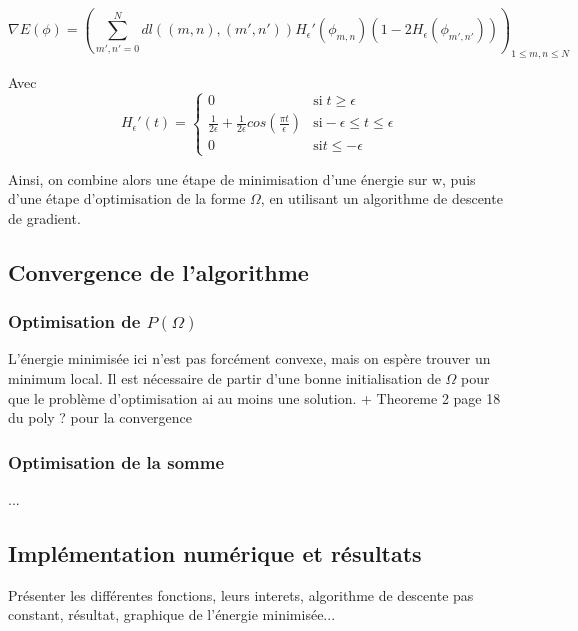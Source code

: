 \[ \nabla E (\phi) = ( \sum \limits_{m',n' = 0}^N dl((m,n),(m',n')) H_{\epsilon}' (\phi_{m,n}) ( 1 - 2H_{\epsilon}(\phi_{m',n'}))  ) _{1 \leq m,n \leq N} \] 

Avec 
\[ H_{\epsilon}' (t) = \left\{ \begin{matrix}
0 & \text{si} \; t \geq \epsilon \\
\frac{1}{2 \epsilon} + \frac{1}{2 \epsilon} cos(\frac{\pi t}{\epsilon}) & \text{si} -\epsilon \leq t \leq \epsilon \\
0 & \text{si} t \leq - \epsilon 
\end{matrix} \right. \] 


Ainsi, on combine alors une étape de minimisation d'une énergie sur w, puis d'une étape d'optimisation de la forme $\Omega$, en utilisant un algorithme de descente de gradient. 

\subsection{Convergence de l'algorithme}

\subsubsection{Optimisation de \texorpdfstring{$P(\Omega)$}{Lg}}

L'énergie minimisée ici n'est pas forcément convexe, mais on espère trouver un minimum local. Il est nécessaire de partir d'une bonne initialisation de $\Omega$ pour que le problème d'optimisation ai au moins une solution. 
+ Theoreme 2 page 18 du poly ? pour la convergence 

\subsubsection{Optimisation de la somme}
...
\subsection{Implémentation numérique et résultats}

Présenter les différentes fonctions, leurs interets, algorithme de descente pas constant, résultat, graphique de l'énergie minimisée...